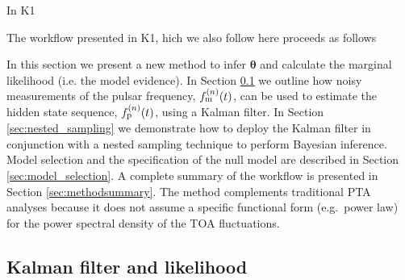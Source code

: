 \documentclass[fleqn,usenatbib,useAMS]{mnras}
\begin{document}
In K1 














The workflow presented in K1, hich we also follow here proceeds as follows











In this section we present a new method to infer $\boldsymbol{\theta}$ and calculate the marginal likelihood (i.e. the model evidence). In Section \ref{sec:kalman_filter} we outline how noisy measurements of the pulsar frequency, $f_{\rm m}^{(n)}(t)$, can be used to estimate the hidden state sequence, $f_{\rm p}^{(n)}(t)$, using a Kalman filter. In Section \ref{sec:nested_sampling} we demonstrate how to deploy the Kalman filter in conjunction with a nested sampling technique to perform Bayesian inference. Model selection and the specification of the null model are described in Section \ref{sec:model_selection}. A complete summary of the workflow is presented in Section \ref{sec:methodsummary}. The method complements traditional PTA analyses because it does not assume a specific functional form (e.g.\ power law) for the power spectral density of the TOA fluctuations.

\subsection{Kalman filter and likelihood}\label{sec:kalman_filter}
\end{document}
